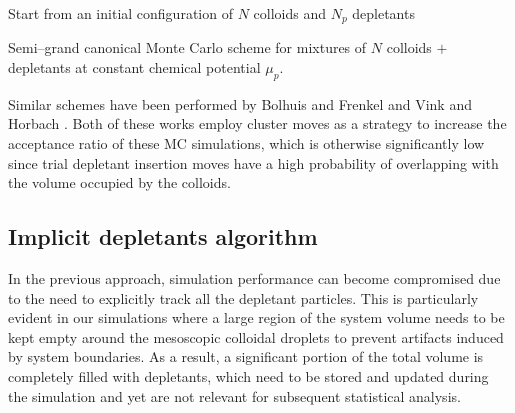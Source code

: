 \begin{algorithm}[h]
    \SetAlgoLined

    Start from an initial configuration of $N$ colloids and $N_p$ depletants\;
    \caption{Semi--grand canonical Monte Carlo scheme for mixtures of $N$ colloids $+$ depletants at constant chemical potential $\mu_p$. }
    \label{algo:semiHPMC}
\end{algorithm}

Similar schemes have been performed by Bolhuis and Frenkel \cite{Bolhuis1994} and Vink and Horbach \cite{Vink2004}. Both of these works employ cluster moves as a strategy to increase the acceptance ratio of these MC simulations, which is otherwise significantly low since trial depletant insertion moves have a high probability of overlapping with the volume occupied by the colloids.

\subsection{Implicit depletants algorithm}
\label{sec:implicit}

In the previous approach, simulation performance can become compromised due to the need to explicitly track all the depletant particles. This is particularly evident in our simulations where a large region of the system volume needs to be kept empty around the mesoscopic colloidal droplets to prevent artifacts induced by system boundaries. As a result, a significant portion of the total volume is completely filled with depletants, which need to be stored and updated during the simulation and yet are not relevant for subsequent statistical analysis.

